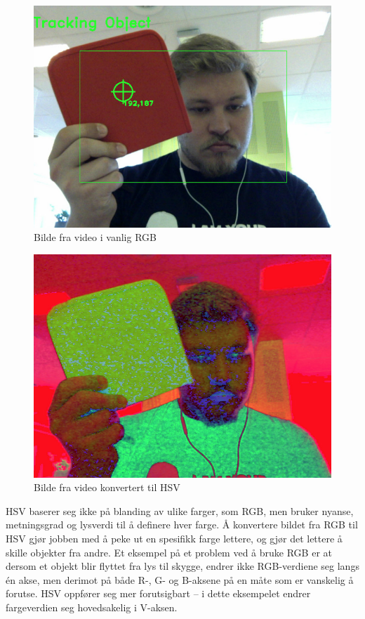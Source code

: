 \begin{figure}[h!]
	\centering
	\includegraphics[scale=0.47]{img/first-rgb.jpg}
	\caption[Første iterasjon RGB bilde]{Bilde fra video i vanlig RGB}
	\label{fig:firstiterationrgb}
\end{figure}

\begin{figure}[h!]
	\centering
	\includegraphics[scale=0.47]{img/first-hsv.jpg}
	\caption[Første iterasjon HSV bilde]{Bilde fra video konvertert til HSV}	\label{fig:firstiterationhsv}
\end{figure}

HSV baserer seg ikke på blanding av ulike farger, som RGB, men bruker nyanse, metningsgrad og lysverdi til å definere hver farge. Å konvertere bildet fra RGB til HSV gjør jobben med å peke ut en spesifikk farge lettere, og gjør det lettere å skille objekter fra andre. Et eksempel på et problem ved å bruke RGB er at dersom et objekt blir flyttet fra lys til skygge, endrer ikke RGB-verdiene seg langs én akse, men derimot på både R-, G- og B-aksene på en måte som er vanskelig å forutse. HSV oppfører seg mer forutsigbart -- i dette eksempelet endrer fargeverdien seg hovedsakelig i V-aksen.

